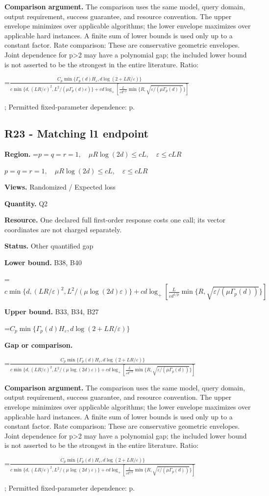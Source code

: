 \documentclass[10pt,a4paper]{article}
\newcommand{\AtlasMath}[1]{\par\begingroup\centering\setbox0=\hbox{$\displaystyle #1$}\ifdim\wd0>1.4\linewidth\typeout{ATLAS WIDE FORMULA: \the\wd0}\fi\ifdim\wd0>\linewidth\resizebox{\linewidth}{!}{\box0}\else\box0\fi\par\endgroup}
\newcommand{\AtlasInlineMath}[1]{\begingroup\setbox0=\hbox{$#1$}\ifdim\wd0>.4\linewidth\endgroup\AtlasMath{#1}\else\endgroup$#1$\fi}
\begin{document}
\textbf{Comparison argument.} The comparison uses the same model, query domain, output requirement, success guarantee, and resource convention. The upper envelope minimizes over applicable algorithms; the lower envelope maximizes over applicable hard instances. A finite sum of lower bounds is used only up to a constant factor. Rate comparison: These are conservative geometric envelopes. Joint dependence for p>2 may have a polynomial gap; the included lower bound is not asserted to be the strongest in the entire literature. Ratio: 
\AtlasMath{\frac{C_p\min\{\Gamma_p(d)H_\varepsilon,d\log(2+LR/\varepsilon)\}}{c\min\{d,(LR/\varepsilon)^2,L^2/(\mu\Gamma_p(d)\varepsilon)\}+cd\log_+[\frac{L}{\varepsilon d^{1/p}}\min\{R,\sqrt{\varepsilon/(\mu\Gamma_p(d))}\}]}}
; Permitted fixed-parameter dependence: p.

\subsection{R23 - Matching l1 endpoint}
\textbf{Region.} \AtlasInlineMath{p=q=r=1,\quad\mu R\log(2d)\le cL,\quad\varepsilon\le cLR}

\textbf{Views.} Randomized / Expected loss

\textbf{Quantity.} Q2

\textbf{Resource.} One declared full first-order response costs one call; its vector coordinates are not charged separately.

\textbf{Status.} Other quantified gap

\textbf{Lower bound.} B38, B40

\AtlasMath{c\min\{d,(LR/\varepsilon)^2,L^2/(\mu\log(2d)\varepsilon)\}+cd\log_+[\frac{L}{\varepsilon d^{1/p}}\min\{R,\sqrt{\varepsilon/(\mu\Gamma_p(d))}\}]}
\textbf{Upper bound.} B33, B34, B27

\AtlasMath{C_p\min\{\Gamma_p(d)H_\varepsilon,d\log(2+LR/\varepsilon)\}}
\textbf{Gap or comparison.} 
\AtlasMath{\frac{C_p\min\{\Gamma_p(d)H_\varepsilon,d\log(2+LR/\varepsilon)\}}{c\min\{d,(LR/\varepsilon)^2,L^2/(\mu\log(2d)\varepsilon)\}+cd\log_+[\frac{L}{\varepsilon d^{1/p}}\min\{R,\sqrt{\varepsilon/(\mu\Gamma_p(d))}\}]}}


\textbf{Comparison argument.} The comparison uses the same model, query domain, output requirement, success guarantee, and resource convention. The upper envelope minimizes over applicable algorithms; the lower envelope maximizes over applicable hard instances. A finite sum of lower bounds is used only up to a constant factor. Rate comparison: These are conservative geometric envelopes. Joint dependence for p>2 may have a polynomial gap; the included lower bound is not asserted to be the strongest in the entire literature. Ratio: 
\AtlasMath{\frac{C_p\min\{\Gamma_p(d)H_\varepsilon,d\log(2+LR/\varepsilon)\}}{c\min\{d,(LR/\varepsilon)^2,L^2/(\mu\log(2d)\varepsilon)\}+cd\log_+[\frac{L}{\varepsilon d^{1/p}}\min\{R,\sqrt{\varepsilon/(\mu\Gamma_p(d))}\}]}}
; Permitted fixed-parameter dependence: p.
\end{document}
